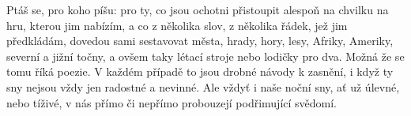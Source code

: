 Ptáš se, pro koho píšu: pro ty, co jsou ochotni přistoupit alespoň na chvilku na hru, kterou jim nabízím, a co z několika slov, z několika řádek, jež jim předkládám, dovedou sami sestavovat města, hrady, hory, lesy, Afriky, Ameriky, severní a jižní točny, a ovšem taky létací stroje nebo lodičky pro dva. Možná že se tomu říká poezie. V každém případě to jsou drobné návody k zasnění, i když ty sny nejsou vždy jen radostné a nevinné. Ale vždyť i naše noční sny, ať už úlevné, nebo tíživé, v nás přímo či nepřímo probouzejí podřimující svědomí.




